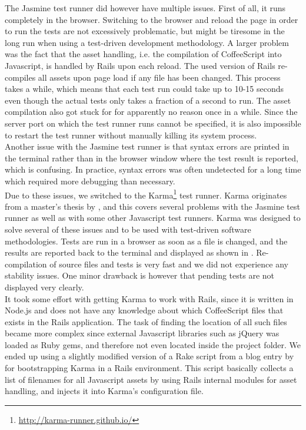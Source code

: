 The Jasmine test runner did however have multiple issues. First of all,
it runs completely in the browser. Switching to the browser and reload
the page in order to run the tests are not excessively problematic, but
might be tiresome in the long run when using a test-driven development
methodology. A larger problem was the fact that the asset handling, i.e.
the compilation of CoffeeScript into Javascript, is handled by Rails
upon each reload. The used version of Rails re-compiles all assets upon
page load if any file has been changed. This process takes a while,
which means that each test run could take up to 10-15 seconds even
though the actual tests only takes a fraction of a second to run. The
asset compilation also got stuck for for apparently no reason once in a
while. Since the server port on which the test runner runs cannot be
specified, it is also impossible to restart the test runner without
manually killing its system process.\\

Another issue with the Jasmine test runner is that syntax errors are
printed in the terminal rather than in the browser window where the test
result is reported, which is confusing. In practice, syntax errors was
often undetected for a long time which required more debugging than
necessary.\\

Due to these issues, we switched to the Karma\footnote{
\url{http://karma-runner.github.io/}} test runner. Karma originates from
a master's thesis by \citet{article:karma}, and this covers several
problems with the Jasmine test runner as well as with some other
Javascript test runners. Karma was designed to solve several of these
issues and to be used with test-driven software methodologies. Tests are
run in a browser as soon as a file is changed, and the results are
reported back to the terminal and displayed as shown in
. Re-compilation of source files and tests is
very fast and we did not experience any stability issues. One minor
drawback is however that pending tests are not displayed very clearly.\\

It took some effort with getting Karma to work with Rails, since it is
written in Node.js and does not have any knowledge about which
CoffeeScript files that exists in the Rails application. The task of
finding the location of all such files became more complex since
external Javascript libraries such as jQuery was loaded as Ruby gems,
and therefore not even located inside the project folder. We ended up
using a slightly modified version of a Rake script from a blog entry by
\citet{web:saunier_angular} for bootstrapping Karma in a Rails
environment. This script basically collects a list of filenames for all
Javascript assets by using Rails internal modules for asset handling,
and injects it into Karma's configuration file.\\

